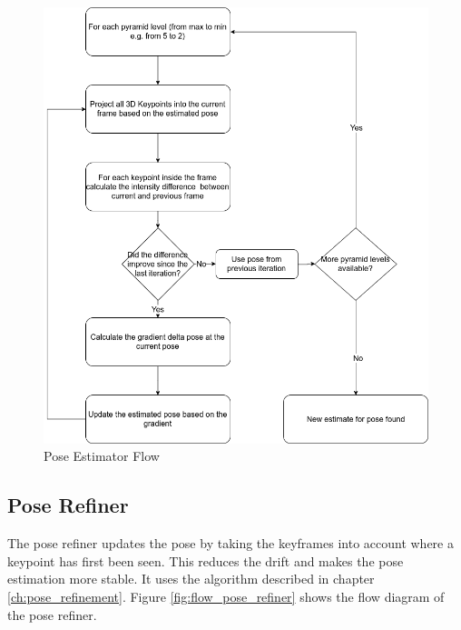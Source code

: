 \documentclass[11pt,a4paper,titlepage,oneside]{report}
\begin{document}
\begin{figure}[H]
  \centering
  \includegraphics[scale=0.3]{img/flow_pose_estimator.png}
  \caption{Pose Estimator Flow}\label{fig:flow_pose_estimator}
\end{figure}

\subsection{Pose Refiner}

The pose refiner updates the pose by taking the keyframes into account where a keypoint has first been seen. This reduces the drift and makes the pose estimation more stable. It uses the algorithm described in chapter \ref{ch:pose_refinement}. Figure \ref{fig:flow_pose_refiner} shows the flow diagram of the pose refiner.
\end{document}
